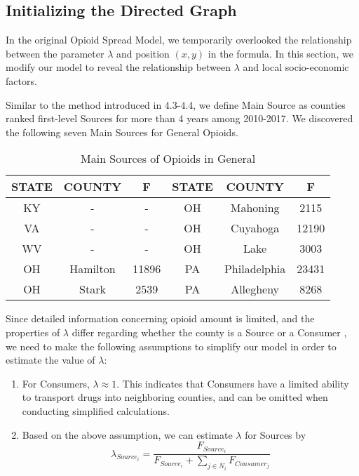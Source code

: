 \subsection{Initializing the Directed Graph}
In the original Opioid Spread Model, we temporarily overlooked the relationship between the parameter $\lambda$ and position $(x,y)$ in the formula. In this section, we modify our model to reveal the relationship between $\lambda$ and local socio-economic factors. 

Similar to the method introduced in 4.3-4.4, we define Main Source as counties ranked first-level Sources for more than 4 years among 2010-2017. We discovered the following seven Main Sources for General Opioids.

\begin{table}[H]
	\centering
	\begin{tabular}{|c|c|c||c|c|c|}
		\hline
		\rowcolor[HTML]{656565} 
		{\color[HTML]{FFFFFF} \textbf{STATE}} & {\color[HTML]{FFFFFF} \textbf{COUNTY}} & {\color[HTML]{FFFFFF} \textbf{F}} &{\color[HTML]{FFFFFF} \textbf{STATE}} & {\color[HTML]{FFFFFF} \textbf{COUNTY}} & {\color[HTML]{FFFFFF} \textbf{F}}\\ \hline
		KY & - & - &OH & Mahoning & 2115 \\ \hline
		VA & - & - &OH & Cuyahoga & 12190\\ \hline
		WV & - & - &OH& Lake &3003 \\ \hline
		OH & Hamilton & 11896 &PA & Philadelphia & 23431 \\ \hline
		OH & Stark & 2539 & PA & Allegheny & 8268 \\ \hline
	\end{tabular}
	\centering
	\caption{Main Sources of Opioids in General}
\end{table}

Since detailed information concerning opioid amount is limited, and the properties of $\lambda$ differ regarding whether the county is a Source or a Consumer , we need to make the following assumptions to simplify our model in order to estimate the value of $\lambda$:

\begin{enumerate}
	\item For Consumers, $\lambda \approx 1$. This indicates that Consumers have a limited ability to transport drugs into neighboring counties, and can be omitted when conducting simplified calculations.
	
	\item Based on the above assumption, we can estimate $\lambda$ for Sources by
	\begin{equation}
	\lambda_{Source_i}=\frac{F_{Source_i}}{F_{Source_i}+\sum_{j\in N_i} F_{Consumer_j}}
	\end{equation} 
\end{enumerate}

